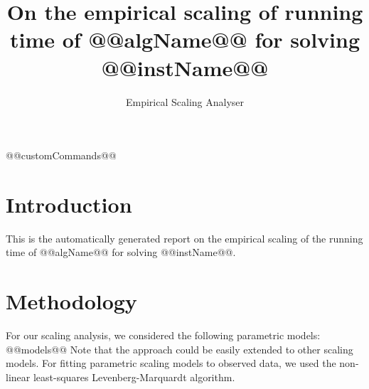 \newcommand{\medianInterval}[1]{}
\newcommand{\randomizedAlgorithm}[1]{}
@@customCommands@@

\makeatletter

\providecommand{\tabularnewline}{\\}


\title{On the empirical scaling of running time of @@algName@@ for solving @@instName@@}
\author{Empirical Scaling Analyser}

\makeatother

\usepackage{babel}

\maketitle %


\section{Introduction}

This is the automatically generated report on the empirical scaling
of the running time of @@algName@@ for solving @@instName@@.


\section{Methodology}

\label{sec:Methodology}

For our scaling analysis, we considered the following parametric models:
@@models@@
Note that the approach could be easily extended to other scaling models.
For fitting parametric scaling models to observed data, we used the
non-linear least-squares Levenberg-Marquardt algorithm.


